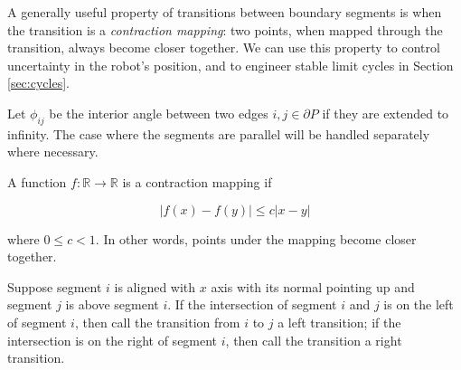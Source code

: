\documentclass[]{styles/svproc}  %
\begin{document}
A generally useful property of transitions between boundary segments is when the
transition is a \emph{contraction mapping}: two points, when mapped through the
transition, always become closer together. We can use this property to control
uncertainty in the robot's position, and to engineer stable limit cycles in
Section \ref{sec:cycles}.

\begin{definition}
Let $\phi_{ij}$ be the interior angle between two edges $i, j \in \partial P$ if
they are extended to infinity. The case where the segments are parallel will be
handled separately where necessary. 
\end{definition}

\begin{definition}

A function $f: \mathbb{R} \to \mathbb{R}$ is a contraction mapping if

\begin{equation*}
|f(x) - f(y)| \leq c |x-y|
\end{equation*}

where $0 \leq c < 1$. In other words, points under the mapping become closer
together.
\end{definition}
\begin{definition}
Suppose segment $i$ is aligned with $x$ axis with its normal pointing up and
segment $j$ is above segment $i$. If the intersection of segment $i$ and $j$ is
on the left of segment $i$, then call the transition from $i$ to $j$ a left
transition; if the intersection is on the right of segment $i$, then call the
transition a right transition.
\end{definition}
\end{document}
